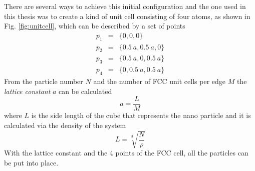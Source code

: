 \documentclass[12pt]{article}
\begin{document}
There are several ways to achieve this initial configuration and the one used in this thesis \cite{buffalo} was to create a kind of unit cell 
consisting of four atoms, as shown in Fig. \ref{fig:unitcell}, which can be described by a set of points
\begin{eqnarray*}
    p_1 &=& \{0,0,0\}\\
    p_2 &=& \{0.5 \ a,0.5 \ a,0\}\\
    p_3 &=& \{0.5 \ a,0,0.5 \ a\}\\
    p_4 &=& \{0,0.5 \ a,0.5 \ a\}
\end{eqnarray*}
From the particle number $N$ and the number of FCC unit cells per edge $M$ the \textit{lattice constant} $a$ can be calculated
\begin{equation}
    a = \frac{L}{M}
\end{equation}
where $L$ is the side length of the cube that represents the nano particle and it is calculated via the density of the system
\begin{equation}
    L = \sqrt[3]{\frac{N}{\rho}}
\end{equation}
With the lattice constant and the 4 points of the FCC cell, all the particles can be put into place.
\end{document}
